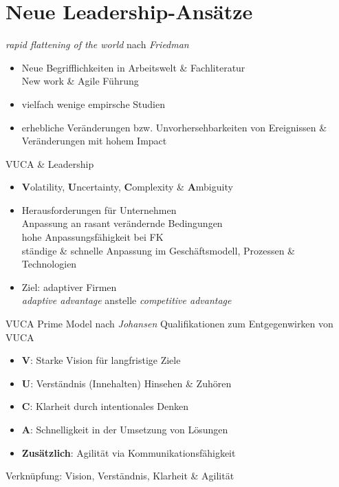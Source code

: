 \documentclass{cheatsheet}
\begin{document}
    \section{Neue Leadership-Ansätze}
    \begin{hintbox}{\emph{rapid flattening of the world} nach \emph{Friedman}}
        \begin{itemize}
            \item Neue Begrifflichkeiten in Arbeitswelt \& Fachliteratur\\
            \ra New work \& Agile Führung
            \item vielfach wenige empirsche Studien
            \item erhebliche Veränderungen bzw. Unvorhersehbarkeiten von Ereignissen \& Veränderungen mit hohem Impact
        \end{itemize}
    \end{hintbox}
    \begin{sectionbox}{VUCA \& Leadership}
        \begin{itemize}
            \item \textbf{V}olatility, \textbf{U}ncertainty, \textbf{C}omplexity \& \textbf{A}mbiguity
            \item Herausforderungen für Unternehmen\\
            \ra Anpassung an rasant verändernde Bedingungen\\
            \ra  hohe Anpassungsfähigkeit bei FK\\
            \ra ständige \& schnelle Anpassung im Geschäftsmodell, Prozessen \& Technologien 
            \item Ziel: adaptiver Firmen\\
            \ra \emph{adaptive advantage} anstelle \emph{competitive advantage}
        \end{itemize}
    \end{sectionbox}
    \begin{warningbox}{VUCA Prime Model nach \emph{Johansen}}
        \ra Qualifikationen zum Entgegenwirken von VUCA
        \begin{itemize}
            \item \textbf{V}: Starke Vision für langfristige Ziele
            \item \textbf{U}: Verständnis (Innehalten) \ra Hinsehen \& Zuhören
            \item \textbf{C}: Klarheit durch intentionales Denken
            \item \textbf{A}:  Schnelligkeit in der Umsetzung von Lösungen
            \item \textbf{Zusätzlich}: Agilität via Kommunikationsfähigkeit \\
        \end{itemize}
        \ra Verknüpfung: Vision, Verständnis, Klarheit \& Agilität
    \end{warningbox}
\end{document}
